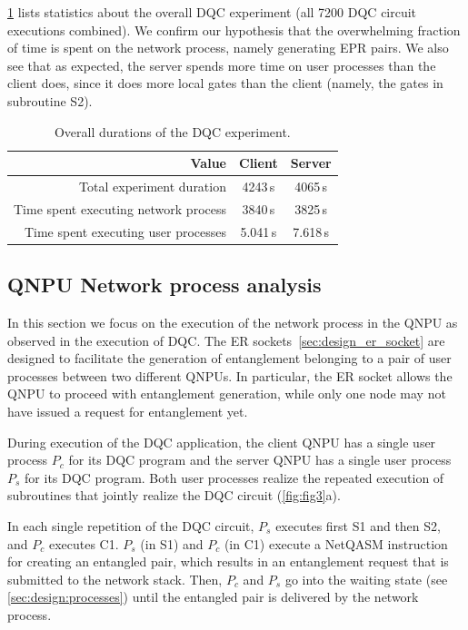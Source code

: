 \cref{tab:exp_durations} lists statistics about the overall \ac{DQC} experiment (all 7200 \ac{DQC} circuit executions combined). We confirm our hypothesis that the overwhelming fraction of time is spent on the network process, namely generating \ac{EPR} pairs. We also see that as expected, the server spends more time on user processes than the client does, since it does more local gates than the client (namely, the gates in subroutine S2).

\begin{table}[htpb]
    \centering
    \begin{tabular}{|r|c|c|}
    \hline
    \textbf{Value} & \textbf{Client} & \textbf{Server} \\ 
    \hline
    Total experiment duration & 4243\,s & 4065\,s \\
    Time spent executing network process & 3840\,s & 3825\,s \\
    Time spent executing user processes & 5.041\,s & 7.618\,s \\
    \hline
    \end{tabular}
    \caption{Overall durations of the \ac{DQC} experiment.}
    \label{tab:exp_durations}
\end{table}

\subsection{QNPU Network process analysis}

In this section we focus on the execution of the network process in the \ac{QNPU} as observed in the execution of \ac{DQC}. The \ac{ER} sockets~\ref{sec:design_er_socket} are designed to facilitate the generation of entanglement belonging to a pair of user processes between two different \acp{QNPU}. In particular, the \ac{ER} socket allows the \ac{QNPU} to proceed with entanglement generation, while only one node may not have issued a request for entanglement yet. 

During execution of the \ac{DQC} application, the client \ac{QNPU} has a single user process $P_c$ for its \ac{DQC} program and the server \ac{QNPU} has a single user process $P_s$ for its \ac{DQC} program. Both user processes realize the repeated execution of subroutines that jointly realize the \ac{DQC} circuit (\cref{fig:fig3}a).

In each single repetition of the \ac{DQC} circuit, $P_s$ executes first S1 and then S2, and $P_c$ executes C1. $P_s$ (in S1) and $P_c$ (in C1) execute a \ac{NetQASM} instruction for creating an entangled pair, which results in an entanglement request that is submitted to the network stack. Then, $P_c$ and $P_s$ go into the waiting state (see \cref{sec:design:processes}) until the entangled pair is delivered by the network process.

